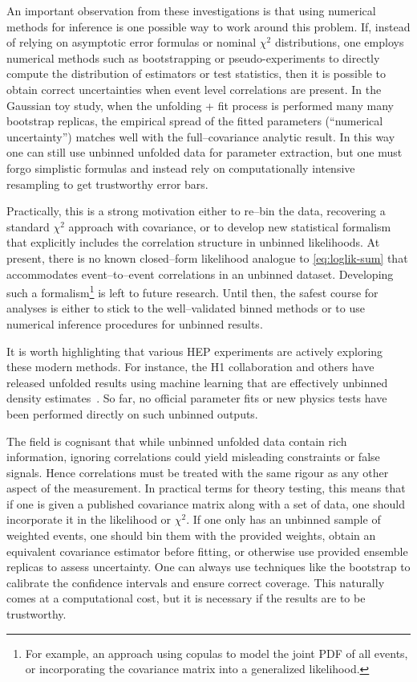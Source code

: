     An important observation from these investigations is that using numerical methods for inference is one possible way to work around this problem.
    If, instead of relying on asymptotic error formulas or nominal $\chi^2$ distributions, one employs numerical methods such as bootstrapping or pseudo-experiments to directly compute the distribution of estimators or test statistics, then it is possible to obtain correct uncertainties when event level correlations are present.
    In the Gaussian toy study, when the unfolding + fit process is performed many many bootstrap replicas, the empirical spread of the fitted parameters (``numerical uncertainty'') matches well with the full--covariance analytic result.
    In this way one can still use unbinned unfolded data for parameter extraction, but one must forgo simplistic formulas and instead rely on computationally intensive resampling to get trustworthy error bars.
    
    Practically, this is a strong motivation either to re--bin the data, recovering a standard $\chi^2$ approach with covariance, or to develop new statistical formalism that explicitly includes the correlation structure in unbinned likelihoods.
    At present, there is no known closed--form likelihood analogue to \cref{eq:loglik-sum} that accommodates event--to--event correlations in an unbinned dataset.
    Developing such a formalism\footnote{For example, an approach using copulas to model the joint PDF of all events, or incorporating the covariance matrix into a generalized likelihood.} is left to future research.
    Until then, the safest course for analyses is either to stick to the well--validated binned methods or to use numerical inference procedures for unbinned results.

    It is worth highlighting that various HEP experiments are actively exploring these modern methods.
    For instance, the H1 collaboration and others have released unfolded results using machine learning that are effectively unbinned density estimates~\cite{H1:2021wkz}.
    So far, no official parameter fits or new physics tests have been performed directly on such unbinned outputs.
    
    The field is cognisant that while unbinned unfolded data contain rich information, ignoring correlations could yield misleading constraints or false signals.
    Hence correlations must be treated with the same rigour as any other aspect of the measurement.
    In practical terms for theory testing, this means that if one is given a published covariance matrix along with a set of data, one should incorporate it in the likelihood or $\chi^2$.
    If one only has an unbinned sample of weighted events, one should bin them with the provided weights, obtain an equivalent covariance estimator before fitting, or otherwise use provided ensemble replicas to assess uncertainty.
    One can always use techniques like the bootstrap to calibrate the confidence intervals and ensure correct coverage.
    This naturally comes at a computational cost, but it is necessary if the results are to be trustworthy.
    
